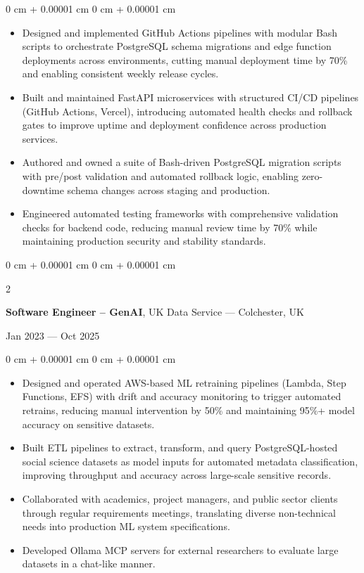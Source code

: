\documentclass[6pt, letterpaper]{article}
\newenvironment{highlights}{
    \begin{itemize}[
        topsep=0.03 cm,
        parsep=0.03 cm,
        partopsep=0pt,
        itemsep=0pt,
        leftmargin=0 cm + 10pt
    ]
}{
    \end{itemize}
} %
\newenvironment{onecolentry}{
    \begin{adjustwidth}{
        0 cm + 0.00001 cm
    }{
        0 cm + 0.00001 cm
    }
}{
    \end{adjustwidth}
} %
\newenvironment{twocolentry}[2][]{
    \onecolentry
    \def\secondColumn{#2}
    \setcolumnwidth{\fill, 4.5 cm}
    \begin{paracol}{2}
}{
    \switchcolumn \raggedleft \secondColumn
    \end{paracol}
    \endonecolentry
} %
\begin{document}
        \begin{onecolentry}
        \begin{highlights}
            \item Designed and implemented GitHub Actions pipelines with modular Bash scripts to orchestrate PostgreSQL schema migrations and edge function deployments across environments, cutting manual deployment time by 70\% and enabling consistent weekly release cycles.
            \item Built and maintained FastAPI microservices with structured CI/CD pipelines (GitHub Actions, Vercel), introducing automated health checks and rollback gates to improve uptime and deployment confidence across production services.
            \item Authored and owned a suite of Bash-driven PostgreSQL migration scripts with pre/post validation and automated rollback logic, enabling zero-downtime schema changes across staging and production.
            \item Engineered automated testing frameworks with comprehensive validation checks for backend code, reducing manual review time by 70\% while maintaining production security and stability standards.
        \end{highlights}
        \end{onecolentry}

        \begin{twocolentry}{Jan 2023 --- Oct 2025}
        \textbf{Software Engineer – GenAI}, UK Data Service --- Colchester, UK
        \end{twocolentry}

        \begin{onecolentry}
        \begin{highlights}

            \item Designed and operated AWS-based ML retraining pipelines (Lambda, Step Functions, EFS) with drift and accuracy monitoring to trigger automated retrains, reducing manual intervention by 50\% and maintaining 95\%+ model accuracy on sensitive datasets.
            \item Built ETL pipelines to extract, transform, and query PostgreSQL-hosted social science datasets as model inputs for automated metadata classification, improving throughput and accuracy across large-scale sensitive records.
            \item Collaborated with academics, project managers, and public sector clients through regular requirements meetings, translating diverse non-technical needs into production ML system specifications.
            \item Developed Ollama MCP servers for external researchers to evaluate large datasets in a chat-like manner.

        \end{highlights}
        \end{onecolentry}
\end{document}
